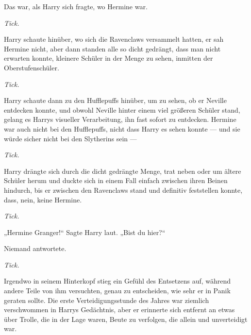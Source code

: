 Das war, als Harry sich fragte, wo Hermine war.

\emph{Tick.}

Harry schaute hinüber, wo sich die Ravenclaws versammelt hatten, er sah Hermine nicht, aber dann standen alle so dicht gedrängt, dass man nicht erwarten konnte, kleinere Schüler in der Menge zu sehen, inmitten der Oberstufenschüler.

\emph{Tick.}

Harry schaute dann zu den Hufflepuffs hinüber, um zu sehen, ob er Neville entdecken konnte, und obwohl Neville hinter einem viel größeren Schüler stand, gelang es Harrys visueller Verarbeitung, ihn fast sofort zu entdecken. Hermine war auch nicht bei den Hufflepuffs, nicht dass Harry es sehen konnte — und sie würde sicher nicht bei den Slytherins sein —

\emph{Tick.}

Harry drängte sich durch die dicht gedrängte Menge, trat neben oder um ältere Schüler herum und duckte sich in einem Fall einfach zwischen ihren Beinen hindurch, bis er zwischen den Ravenclaws stand und definitiv feststellen konnte, dass, nein, keine Hermine.

\emph{Tick.}

„Hermine Granger!“ Sagte Harry laut.
„Bist du hier?“

Niemand antwortete.

\emph{Tick.}

Irgendwo in seinem Hinterkopf stieg ein Gefühl des Entsetzens auf, während andere Teile von ihm versuchten, genau zu entscheiden, wie sehr er in Panik geraten sollte. Die erste Verteidigungsstunde des Jahres war ziemlich verschwommen in Harrys Gedächtnis, aber er erinnerte sich entfernt an etwas über Trolle, die in der Lage waren, Beute zu verfolgen, die allein und unverteidigt war.

